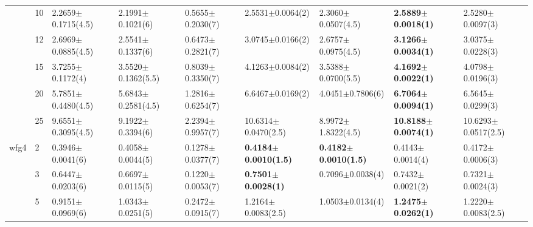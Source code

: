 \begin{table*}[]
\begin{adjustbox}{width=1.0\textwidth,center}
\begin{tabular}{lllllllll}
      & 10                             & 2.2659$\pm$0.1715(4.5)       & 2.1991$\pm$0.1021(6)          & 0.5655$\pm$0.2030(7)              & 2.5531$\pm$0.0064(2)                              & 2.3060$\pm$0.0507(4.5)                   & \textbf{2.5889$\pm$0.0018(1)}              & 2.5280$\pm$0.0097(3)            \\
      & 12                             & 2.6969$\pm$0.0885(4.5)       & 2.5541$\pm$0.1337(6)          & 0.6473$\pm$0.2821(7)              & 3.0745$\pm$0.0166(2)                              & 2.6757$\pm$0.0975(4.5)                   & \textbf{3.1266$\pm$0.0034(1)}              & 3.0375$\pm$0.0228(3)            \\
      & 15                             & 3.7255$\pm$0.1172(4)         & 3.5520$\pm$0.1362(5.5)        & 0.8039$\pm$0.3350(7)              & 4.1263$\pm$0.0084(2)                              & 3.5388$\pm$0.0700(5.5)                   & \textbf{4.1692$\pm$0.0022(1)}              & 4.0798$\pm$0.0196(3)            \\
      & 20                             & 5.7851$\pm$0.4480(4.5)       & 5.6843$\pm$0.2581(4.5)        & 1.2816$\pm$0.6254(7)              & 6.6467$\pm$0.0169(2)                              & 4.0451$\pm$0.7806(6)                     & \textbf{6.7064$\pm$0.0094(1)}              & 6.5645$\pm$0.0299(3)            \\
      & 25                             & 9.6551$\pm$0.3095(4.5)       & 9.1922$\pm$0.3394(6)          & 2.2394$\pm$0.9957(7)              & 10.6314$\pm$0.0470(2.5)                           & 8.9972$\pm$1.8322(4.5)                   & \textbf{10.8188$\pm$0.0074(1)}             & 10.6293$\pm$0.0517(2.5)         \\\thickhline
wfg4  & 2                              & 0.3946$\pm$0.0041(6)         & 0.4058$\pm$0.0044(5)          & 0.1278$\pm$0.0377(7)              & \textbf{0.4184$\pm$0.0010(1.5)}                   & \textbf{0.4182$\pm$0.0010(1.5)}          & 0.4143$\pm$0.0014(4)                       & 0.4172$\pm$0.0006(3)            \\
      & 3                              & 0.6447$\pm$0.0203(6)         & 0.6697$\pm$0.0115(5)          & 0.1220$\pm$0.0053(7)              & \textbf{0.7501$\pm$0.0028(1)}                     & 0.7096$\pm$0.0038(4)                     & 0.7432$\pm$0.0021(2)                       & 0.7321$\pm$0.0024(3)            \\
      & 5                              & 0.9151$\pm$0.0969(6)         & 1.0343$\pm$0.0251(5)          & 0.2472$\pm$0.0915(7)              & 1.2164$\pm$0.0083(2.5)                            & 1.0503$\pm$0.0134(4)                     & \textbf{1.2475$\pm$0.0262(1)}              & 1.2220$\pm$0.0083(2.5)          \\

\end{tabular}
\end{adjustbox}
\end{table*}
